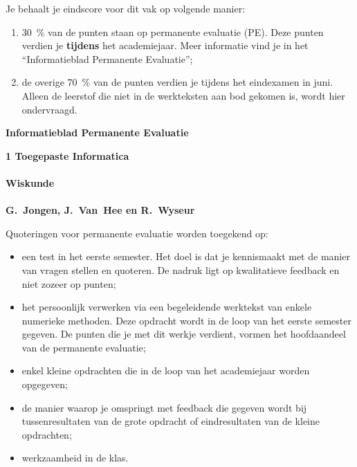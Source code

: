 \documentclass[11pt]{article}
\begin{document}
   \noindent Je behaalt je eindscore voor dit vak op volgende manier:
    \begin{enumerate}
    \item 30~\% van de punten staan op permanente evaluatie (PE). Deze
    punten verdien je \textbf{tijdens} het academiejaar. Meer
    informatie vind je in het ``Informatieblad Permanente
    Evaluatie'';
    \item  de overige 70~\% van de punten verdien je tijdens het eindexamen in juni.
    Alleen de leerstof die niet in de werkteksten aan bod gekomen
    is, wordt hier ondervraagd.
    \end{enumerate}
\newpage

\setlength{\fboxsep}{.7cm} \noindent
\begin{boxedminipage}{\textwidth}
\begin{center}{\Large{\bf Informatieblad Permanente Evaluatie}}\end{center}
 {\bf 1 Toegepaste Informatica} \\ \\
 {\bf Wiskunde} \\ \\
 {\bf G.~Jongen, J.~Van~Hee en R.~Wyseur}
\end{boxedminipage}

\vspace{0.7cm} \noindent Quoteringen voor permanente evaluatie
worden toegekend op:
    \begin{itemize}
        \item  een test in het eerste semester. Het
        doel is dat je kennismaakt met de manier van
        vragen stellen en quoteren.
        De nadruk ligt op kwalitatieve feedback en niet zozeer
        op punten;

        \item  het persoonlijk verwerken via een begeleidende werktekst
        van enkele numerieke methoden. Deze opdracht wordt in de
        loop van het eerste semester gegeven. De punten die je met dit
        werkje verdient, vormen het hoofdaandeel van de permanente evaluatie;

        \item enkel kleine opdrachten die in de loop van het
        academiejaar worden opgegeven;

        \item de manier waarop je omspringt met feedback die
        gegeven wordt bij tussenresultaten van de grote opdracht
        of eindresultaten van de kleine opdrachten;

        \item werkzaamheid in de klas.

      \end{itemize}
\end{document}
